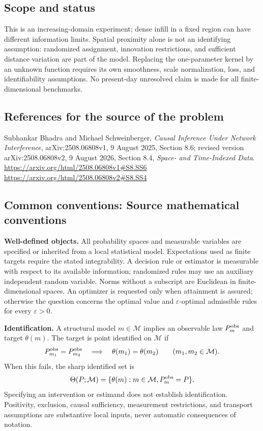 \documentclass[11pt,a4paper]{article}
\begin{document}
\subsection*{Scope and status}
This is an increasing-domain experiment; dense infill in a fixed region can have different information limits. Spatial proximity alone is not an identifying assumption: randomized assignment, innovation restrictions, and sufficient distance variation are part of the model. Replacing the one-parameter kernel by an unknown function requires its own smoothness, scale normalization, loss, and identifiability assumptions. No present-day unresolved claim is made for all finite-dimensional benchmarks.
\subsection*{References for the source of the problem}
Subhankar Bhadra and Michael Schweinberger, \emph{Causal Inference Under Network Interference}, arXiv:2508.06808v1, 9 August 2025, Section 8.6; revised version arXiv:2508.06808v2, 9 August 2026, Section 8.4, \emph{Space- and Time-Indexed Data}.
\url{https://arxiv.org/html/2508.06808v1#S8.SS6}
\url{https://arxiv.org/html/2508.06808v2#S8.SS4}

\subsection*{Common conventions: Source mathematical conventions}

\textbf{Well-defined objects.}
All probability spaces and measurable variables are specified or inherited
from a local statistical model. Expectations used as finite targets require
the stated integrability. A decision rule or estimator is measurable with
respect to its available information; randomized rules may use an auxiliary
independent random variable. Norms without a subscript are Euclidean in
finite-dimensional spaces. An optimizer is requested only when attainment
is assured; otherwise the question concerns the optimal value and
$\varepsilon$-optimal admissible rules for every $\varepsilon>0$.

\textbf{Identification.}
A structural model $m\in\mathcal M$ implies an observable law
$P_m^{\rm obs}$ and target $\theta(m)$. The target is point identified on
$\mathcal M$ if
\[
 P_{m_1}^{\rm obs}=P_{m_2}^{\rm obs}
 \quad\Longrightarrow\quad\theta(m_1)=\theta(m_2)
 \qquad(m_1,m_2\in\mathcal M).
\]
When this fails, the sharp identified set is
\[
 \Theta(P;\mathcal M)=\{\theta(m):m\in\mathcal M,
                                  P_m^{\rm obs}=P\}.
\]
Specifying an intervention or estimand does not establish identification.
Positivity, exclusion, causal sufficiency, measurement restrictions, and
transport assumptions are substantive local inputs, never automatic
consequences of notation.
\end{document}
